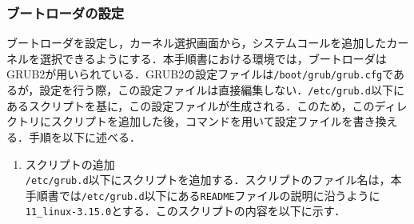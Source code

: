 \documentclass[12pt]{jsarticle}
\begin{document}
\subsubsection{ブートローダの設定}\label{boot}
ブートローダを設定し，カーネル選択画面から，システムコールを追加したカーネルを選択できるようにする．本手順書における環境では，ブートローダはGRUB2が用いられている．GRUB2の設定ファイルは\verb|/boot/grub/grub.cfg|であるが，設定を行う際，この設定ファイルは直接編集しない．\verb|/etc/grub.d|以下にあるスクリプトを基に，この設定ファイルが生成される．このため，このディレクトリにスクリプトを追加した後，コマンドを用いて設定ファイルを書き換える．手順を以下に述べる．
\begin{enumerate}
\item スクリプトの追加\\
\verb|/etc/grub.d|以下にスクリプトを追加する．スクリプトのファイル名は，本手順書では\verb|/etc/grub.d|以下にある\verb|README|ファイルの説明に沿うように\verb|11_linux-3.15.0|とする．このスクリプトの内容を以下に示す．


\end{enumerate}
\end{document}
